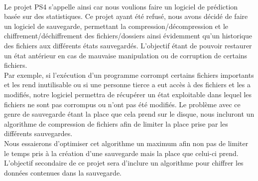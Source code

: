 \paragraph*{}
Le projet PS4 s'appelle ainsi car nous voulions faire un logiciel de prédiction basée
sur des statistiques. Ce projet ayant été refusé, nous avons décidé de faire un logiciel de sauvegarde, permettant la compression/décompression et le chiffrement/déchiffrement des fichiers/dossiers ainsi évidemment qu'un historique des fichiers aux différents états sauvegardés. L'objectif étant de pouvoir restaurer un état antérieur en cas de mauvaise manipulation ou de corruption de certains fichiers.  \\
Par exemple, si l'exécution d'un programme corrompt certains fichiers importants et les rend inutilisable ou si une personne tierce a eut accès à des fichiers et les a modifiés, notre logiciel permettra de récupérer un état exploitable dans lequel les fichiers ne sont pas corrompus ou n'ont pas été modifiés. Le problème avec ce genre de sauvegarde étant la place que cela prend sur le disque, nous incluront un algorithme de compression de fichiers afin de limiter la place prise par les différents sauvegardes. \\
Nous essaierons d'optimiser cet algorithme un maximum afin non pas de limiter le temps pris à la création d'une sauvegarde mais la place que celui-ci prend. L'objectif secondaire de ce projet sera d'inclure un algorithme pour chiffrer les données contenues dans la sauvegarde.